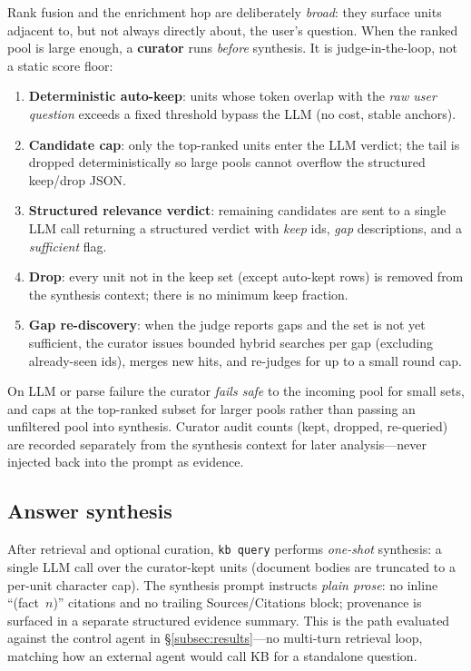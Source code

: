 Rank fusion and the enrichment hop are deliberately \emph{broad}: they surface
units adjacent to, but not always directly about, the user's question.  When the
ranked pool is large enough, a \textbf{curator} runs \emph{before} synthesis.
It is judge-in-the-loop, not a static score floor:
\begin{enumerate}
  \item \textbf{Deterministic auto-keep}: units whose token overlap with the
    \emph{raw user question} exceeds a fixed threshold bypass the LLM (no cost,
    stable anchors).
  \item \textbf{Candidate cap}: only the top-ranked units enter the LLM verdict;
    the tail is dropped deterministically so large pools cannot overflow the
    structured keep/drop JSON.
  \item \textbf{Structured relevance verdict}: remaining candidates are sent to a
    single LLM call returning a structured verdict with \emph{keep} ids,
    \emph{gap} descriptions, and a \emph{sufficient} flag.
  \item \textbf{Drop}: every unit not in the keep set (except auto-kept rows) is
    removed from the synthesis context; there is no minimum keep fraction.
  \item \textbf{Gap re-discovery}: when the judge reports gaps and the set is not
    yet sufficient, the curator issues bounded hybrid searches per gap (excluding
    already-seen ids), merges new hits, and re-judges for up to a small round cap.
\end{enumerate}

On LLM or parse failure the curator \emph{fails safe} to the incoming pool for
small sets, and caps at the top-ranked subset for larger pools rather than
passing an unfiltered pool into synthesis.  Curator audit counts (kept, dropped,
re-queried) are recorded separately from the synthesis context for later
analysis---never injected back into the prompt as evidence.

\subsection{Answer synthesis}
\label{subsec:synthesis}

After retrieval and optional curation, \texttt{kb query} performs \emph{one-shot}
synthesis: a single LLM call over the curator-kept units (document bodies are
truncated to a per-unit character cap).  The synthesis prompt instructs
\emph{plain prose}: no inline ``(fact~$n$)'' citations and no trailing
Sources/Citations block; provenance is surfaced in a separate structured
evidence summary.  This is the path evaluated against the control agent in
\S\ref{subsec:results}---no multi-turn retrieval loop, matching how an external
agent would call KB for a standalone question.

